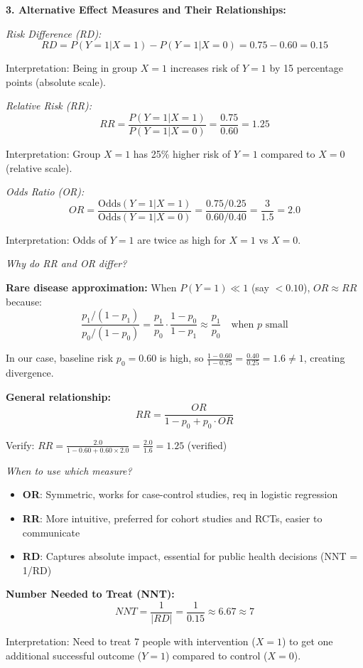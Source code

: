 \documentclass[12pt]{article}
\begin{document}
\begin{explanation}
\textbf{3. Alternative Effect Measures and Their Relationships:}

\textit{Risk Difference (RD):}
\[
RD = P(Y=1|X=1) - P(Y=1|X=0) = 0.75 - 0.60 = 0.15
\]

Interpretation: Being in group $X=1$ increases risk of $Y=1$ by 15 percentage points (absolute scale).

\textit{Relative Risk (RR):}
\[
RR = \frac{P(Y=1|X=1)}{P(Y=1|X=0)} = \frac{0.75}{0.60} = 1.25
\]

Interpretation: Group $X=1$ has 25\% higher risk of $Y=1$ compared to $X=0$ (relative scale).

\textit{Odds Ratio (OR):}
\[
OR = \frac{\text{Odds}(Y=1|X=1)}{\text{Odds}(Y=1|X=0)} = \frac{0.75/0.25}{0.60/0.40} = \frac{3}{1.5} = 2.0
\]

Interpretation: Odds of $Y=1$ are twice as high for $X=1$ vs $X=0$.

\textit{Why do RR and OR differ?}

\textbf{Rare disease approximation:} When $P(Y=1) \ll 1$ (say $< 0.10$), $OR \approx RR$ because:
\[
\frac{p_1/(1-p_1)}{p_0/(1-p_0)} = \frac{p_1}{p_0} \cdot \frac{1-p_0}{1-p_1} \approx \frac{p_1}{p_0} \quad \text{when } p \text{ small}
\]

In our case, baseline risk $p_0 = 0.60$ is high, so $\frac{1-0.60}{1-0.75} = \frac{0.40}{0.25} = 1.6 \neq 1$, creating divergence.

\textbf{General relationship:}
\[
RR = \frac{OR}{1 - p_0 + p_0 \cdot OR}
\]

Verify: $RR = \frac{2.0}{1 - 0.60 + 0.60 \times 2.0} = \frac{2.0}{1.6} = 1.25$ (verified)

\textit{When to use which measure?}

\begin{itemize}
\item \textbf{OR}: Symmetric, works for case-control studies, req in logistic regression
\item \textbf{RR}: More intuitive, preferred for cohort studies and RCTs, easier to communicate
\item \textbf{RD}: Captures absolute impact, essential for public health decisions (NNT = 1/RD)
\end{itemize}

\textbf{Number Needed to Treat (NNT):}
\[
NNT = \frac{1}{|RD|} = \frac{1}{0.15} \approx 6.67 \approx 7
\]

Interpretation: Need to treat 7 people with intervention ($X=1$) to get one additional successful outcome ($Y=1$) compared to control ($X=0$).


\end{explanation}
\end{document}
